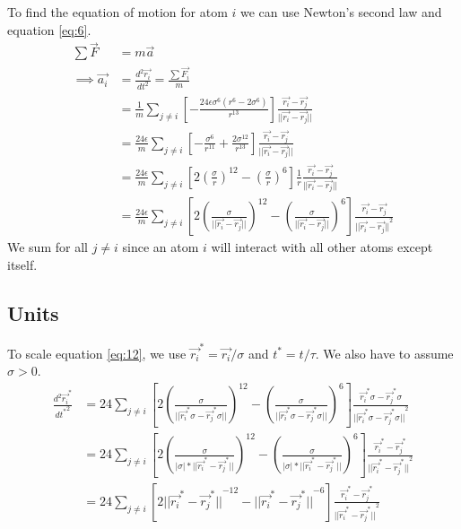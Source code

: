 \documentclass[a4paper,10pt,english]{article}
\begin{document}
To find the equation of motion for atom $i$ we can use Newton's second law and equation \ref{eq:6}.
\begin{align} \label{eq:12}
    \sum \Vec{F} &= m\Vec{a} \\
    \implies\Vec{a_i} &= \frac{d^2\Vec{r_i}}{dt^2} = \frac{\sum \Vec{F_i}}{m} \\
    &= \frac{1}{m} \sum_{j\neq i}{\left [-\frac{24\epsilon\sigma^6(r^6-2\sigma^6)}{r^{13}}\right] \frac{\Vec{r_i} - \Vec{r_j}}{||\Vec{r_i} - \Vec{r_j}||}} \\
    &= \frac{24\epsilon}{m} \sum_{j\neq i}{\left[-\frac{\sigma^6}{r^{11}} + \frac{2\sigma^{12}}{r^{13}}\right] \frac{\Vec{r_i} - \Vec{r_j}}{||\Vec{r_i} - \Vec{r_j}||}} \\
    &= \frac{24\epsilon}{m} \sum_{j\neq i}{\left[{2\left( \frac{\sigma}{r}\right)^{12} - \left( \frac{\sigma}{r}\right)^{6}}\right] \frac{1}{r} \frac{\Vec{r_i} - \Vec{r_j}}{||\Vec{r_i} - \Vec{r_j}||}} \\
    &= \frac{24\epsilon}{m} \sum_{j\neq i}{\left[{2\left( \frac{\sigma}{||\Vec{r_i} - \Vec{r_j}||}\right)^{12} - \left( \frac{\sigma}{||\Vec{r_i} - \Vec{r_j}||}\right)^{6}}\right] \frac{\Vec{r_i} - \Vec{r_j}}{{||\Vec{r_i} - \Vec{r_j}||}^2}}
\end{align}
We sum for all $j \neq i$ since an atom $i$ will interact with all other atoms except itself.

\subsection{Units} \label{1c}

To scale equation \ref{eq:12}, we use $\Vec{r_i}^*=\Vec{r_i}/\sigma$ and $t^*=t/\tau$. We also have to assume $\sigma>0$.
\begin{align}
    \frac{d^2 \Vec{r_i}^*}{d{t^*}^2} 
    &= 24 \sum_{j\neq i}{\left[{2\left( \frac{\sigma}{||\Vec{r_i}^*\sigma - \Vec{r_j}^*\sigma||}\right)^{12} - \left( \frac{\sigma}{||\Vec{r_i}^*\sigma - \Vec{r_j}^*\sigma||}\right)^{6}}\right] \frac{\Vec{r_i}^*\sigma - \Vec{r_j}^*\sigma}{{||\Vec{r_i}^*\sigma - \Vec{r_j}^*\sigma||}^2}} \\
    &= 24 \sum_{j\neq i}{\left[{2\left( \frac{\sigma}{|\sigma|*||\Vec{r_i}^* - \Vec{r_j}^*||}\right)^{12} - \left( \frac{\sigma}{|\sigma|*||\Vec{r_i}^* - \Vec{r_j}^*||}\right)^{6}}\right] \frac{\Vec{r_i}^* - \Vec{r_j}^*}{{||\Vec{r_i}^* - \Vec{r_j}^*||}^2}} \\
    &= 24 \sum_{j\neq i}{\left[{2{||\Vec{r_i}^* - \Vec{r_j}^*||}^{-12} - {||\Vec{r_i}^* - \Vec{r_j}^*||}^{-6}}\right] \frac{\Vec{r_i}^* - \Vec{r_j}^*}{{||\Vec{r_i}^* - \Vec{r_j}^*||}^2}} 
\end{align}
\end{document}
